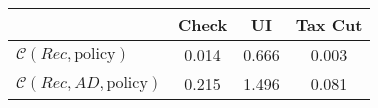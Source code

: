 \begin{tabular}{@{}lccc@{}} 
\toprule 
                          & Check      & UI    & Tax Cut    \\  \midrule 
$\mathcal{C}(Rec,\text{policy})$ & 0.014  & 0.666  & 0.003     \\ 
$\mathcal{C}(Rec, AD,\text{policy})$ & 0.215  & 1.496  & 0.081     \\ 
\end{tabular}  
